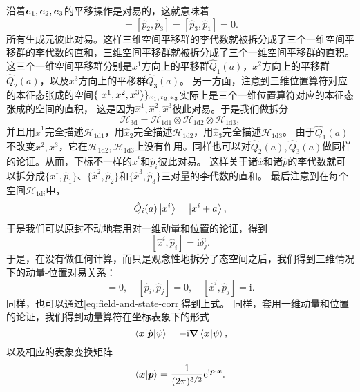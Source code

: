 \documentclass[hyperref, UTF8, a4paper]{ctexart}
\newcommand*{\ii}{\mathrm{i}}
\newcommand*{\ee}{\mathrm{e}}
\begin{document}
沿着$\vb*{e}_1, \vb*{e}_2, \vb*{e}_3$的平移操作是对易的，这就意味着
\begin{equation}
    [\hat{p}_1, \hat{p}_2] = [\hat{p}_2, \hat{p}_3] = [\hat{p}_3, \hat{p}_1] = 0.
\end{equation}
所有生成元彼此对易。这样三维空间平移群的李代数就被拆分成了三个一维空间平移群的李代数的直和，三维空间平移群就被拆分成了三个一维空间平移群的直积。
这三个一维空间平移群分别是$x^1$方向上的平移群$\hat{Q}_1(a)$，$x^2$方向上的平移群$\hat{Q}_2(a)$，以及$x^3$方向上的平移群$\hat{Q}_3(a)$。
另一方面，注意到三维位置算符对应的本征态张成的空间$\{ \ket{x^1, x^2, x^3} \}_{x_1,x_2,x_3}$实际上是三个一维位置算符对应的本征态张成的空间的直积，
这是因为$\hat{x}^1, \hat{x}^2, \hat{x}^3$彼此对易。于是我们做拆分
\[
    \mathcal{H}_\text{3d} = \mathcal{H}_\text{1d1} \otimes \mathcal{H}_\text{1d2} \otimes \mathcal{H}_\text{1d3},
\]
并且用$\hat{x}^1$完全描述$\mathcal{H}_\text{1d1}$，用$\hat{x}_2$完全描述$\mathcal{H}_\text{1d2}$，用$\hat{x}_3$完全描述$\mathcal{H}_\text{1d3}$。
由于$\hat{Q}_1(a)$不改变$x^2, x^3$，它在$\mathcal{H}_\text{1d2},\mathcal{H}_\text{1d3}$上没有作用。同样也可以对$\hat{Q}_2(a),\hat{Q}_3(a)$做同样的论证。从而，下标不一样的$\hat{x}^i$和$\hat{p}_i$彼此对易。
这样关于诸$\hat{x}$和诸$\hat{p}$的李代数就可以拆分成$\{\hat{x}^1, \hat{p}_1\}$、$\{\hat{x}^2, \hat{p}_2\}$和$\{\hat{x}^3, \hat{p}_3\}$三对量的李代数的直和。
最后注意到在每个空间$\mathcal{H}_\text{1d$i$}$中，
\[
    \hat{Q}_i(a) \ket{x^i} = \ket{x^i + a},
\]
于是我们可以原封不动地套用对一维动量和位置的论证，得到
\[
    [\hat{x}^i, \hat{p}_i] = \ii \delta_{j}^i.
\]
于是，在没有做任何计算，而只是观念性地拆分了态空间之后，我们得到三维情况下的动量-位置对易关系：
\begin{equation}
    [\hat{x}^i, \hat{x}^j] = 0, \quad [\hat{p}_i, \hat{p}_j] = 0, \quad [\hat{x}^i, \hat{p}_j] = \ii .
\end{equation}
同样，也可以通过\eqref{eq:field-and-state-corr}得到上式。
同样，套用一维动量和位置的论证，我们得到动量算符在坐标表象下的形式
\begin{equation}
    \mel{\vb*{x}}{\hat{\vb*{p}}}{\psi} = - \ii \grad{\braket{\vb*{x}}{\psi}},
    \label{eq:p-in-x-representation}
\end{equation}
以及相应的表象变换矩阵
\begin{equation}
    \braket{\vb*{x}}{\vb*{p}} = \frac{1}{(2\pi)^{3/2}} \ee^{\ii \vb*{p} \cdot \vb*{x}}.
    \label{eq:x-p-trans}
\end{equation}
\end{document}
